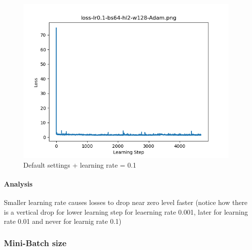 \documentclass{article}[12pt]
\begin{document}
        \begin{figure}[H]
        \includegraphics[width=\linewidth]{testsResults/loss/lr/loss-lr0.1-bs64-hl2-w128-Adam.png}
        \caption{Default settings + learning rate = 0.1}
        \endminipage
    \end{figure}

    \paragraph{Analysis} Smaller learning rate causes losses to drop near zero level faster (notice how there is a vertical drop for lower learning step for leaerning rate 0.001, later for learning rate 0.01 and never for learnig rate 0.1) 

\subsubsection{Mini-Batch size}
\end{document}
